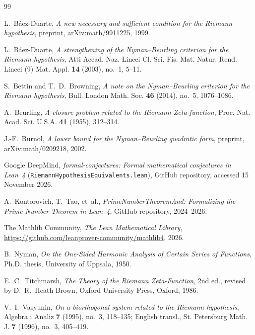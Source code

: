 \documentclass[11pt,a4paper]{article}
\theoremstyle{definition}
\begin{document}
\begin{thebibliography}{99}
\raggedright

L.~B\'aez-Duarte, \emph{A new necessary and sufficient condition for the Riemann hypothesis}, preprint, arXiv:math/9911225, 1999.

L.~B\'aez-Duarte, \emph{A strengthening of the Nyman--Beurling criterion for the Riemann hypothesis}, Atti Accad. Naz. Lincei Cl. Sci. Fis. Mat. Natur. Rend. Lincei (9) Mat. Appl. \textbf{14} (2003), no.~1, 5--11.

S.~Bettin and T.~D.~Browning, \emph{A note on the Nyman--Beurling criterion for the Riemann hypothesis}, Bull. London Math. Soc. \textbf{46} (2014), no.~5, 1076--1086.

A.~Beurling, \emph{A closure problem related to the Riemann Zeta-function}, Proc. Nat. Acad. Sci. U.S.A. \textbf{41} (1955), 312--314.

J.-F.~Burnol, \emph{A lower bound for the Nyman--Beurling quadratic form}, preprint, arXiv:math/0209218, 2002.

Google DeepMind, \emph{formal-conjectures: Formal mathematical conjectures in Lean~4} (\texttt{RiemannHypothesisEquivalents.lean}), GitHub repository, accessed 15 November 2026.

A.~Kontorovich, T.~Tao, et~al., \emph{PrimeNumberTheoremAnd: Formalizing the Prime Number Theorem in Lean~4}, GitHub repository, 2024--2026.

The Mathlib Community, \emph{The Lean Mathematical Library}, \url{https://github.com/leanprover-community/mathlib4}, 2026.

B.~Nyman, \emph{On the One-Sided Harmonic Analysis of Certain Series of Functions}, Ph.D. thesis, University of Uppsala, 1950.

E.~C.~Titchmarsh, \emph{The Theory of the Riemann Zeta-Function}, 2nd ed., revised by D.~R.~Heath-Brown, Oxford University Press, Oxford, 1986.

V.~I.~Vasyunin, \emph{On a biorthogonal system related to the Riemann hypothesis}, Algebra i Analiz \textbf{7} (1995), no.~3, 118--135; English transl., St. Petersburg Math. J. \textbf{7} (1996), no.~3, 405--419.

\end{thebibliography}
\end{document}
